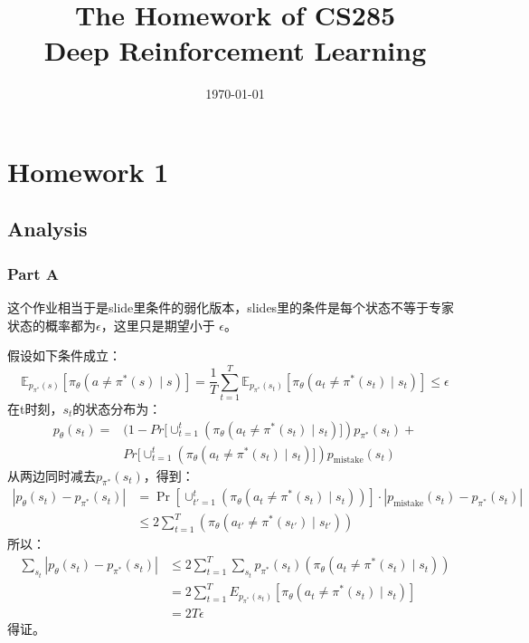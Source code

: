 \documentclass[12pt,oneside]{book}
\title{The Homework of CS285\\
\large Deep Reinforcement Learning}
\author{\Name}
\date{\today}
\begin{document}
\sloppy
\maketitle
{}
\tableofcontents
\setcounter{tocdepth}{2}
\mainmatter
\newpage
{}

\chapter{Homework 1}

\section{Analysis}

\subsection{Part A}

这个作业相当于是slide里条件的弱化版本，slides里的条件是每个状态不等于专家状态的概率都为$\epsilon$，这里只是期望小于
$\epsilon$。

假设如下条件成立：
\begin{equation}
    \mathbb{E}_{p_{\pi^*}(s)} \left[\pi_{\theta}(a \ne \pi^*(s) \mid s)\right] 
    = \frac{1}{T} \sum_{t=1}^{T} \mathbb{E}_{p_{\pi^*}(s_t)} \left[\pi_{\theta}(a_t \ne \pi^*(s_t) \mid s_t)\right]
    \leq \epsilon
\end{equation}
在t时刻，$s_t$的状态分布为：
\begin{align}
    p_{\theta}(s_t) = 
    &(1 - Pr[\cup_{t=1}^{t}(\pi_{\theta}(a_t \ne \pi^*(s_t) \mid s_t)]) p_{\pi^*}(s_t) + \nonumber \\
    &Pr[\cup_{t=1}^{t}(\pi_{\theta}(a_t \ne \pi^*(s_t) \mid s_t)]) p_{\text{mistake}}(s_t)
\end{align}
从两边同时减去$ p_{\pi^*}(s_t)$，得到：
\begin{align}
    |p_{\theta}(s_t) - p_{\pi^*}(s_t)| 
    &= \Pr\left[\cup_{t'=1}^{t} \left(\pi_{\theta}(a_{t} \ne \pi^*(s_{t}) \mid s_{t})\right)\right] \cdot |p_{\text{mistake}}(s_t) - p_{\pi^*}(s_t)| \nonumber \\
    &\leq 2\sum_{t=1}^{T}(\pi_{\theta}(a_{t'} \ne \pi^*(s_{t'}) \mid s_{t'}))
\end{align}
所以：
\begin{align}
    \sum_{s_t}|p_{\theta}(s_t) - p_{\pi^*}(s_t)| 
    &\leq 2\sum_{t=1}^{T}\sum_{s_t}p_{\pi^*}(s_t)(\pi_{\theta}(a_{t} \ne \pi^*(s_{t}) \mid s_{t})) \nonumber \\
    &= 2\sum_{t=1}^{T}E_{p_{\pi^*}(s_t)}[\pi_{\theta}(a_{t} \ne \pi^*(s_{t}) \mid s_{t})] \nonumber \\
    &= 2T\epsilon
\end{align}
得证。
\end{document}
